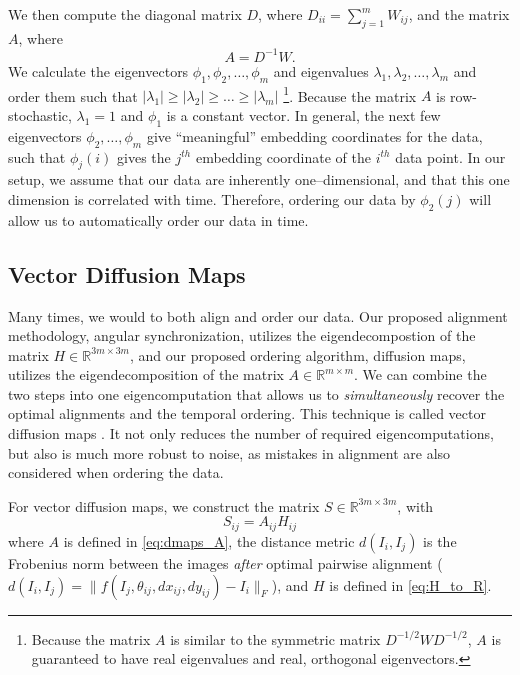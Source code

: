 \documentclass[11pt]{article}
\begin{document}
We then compute the diagonal matrix $D$, where $D_{ii} = \sum_{j=1}^{m} W_{ij}$, and the matrix $A$, where
\begin{equation} \label{eq:dmaps_A}
A = D^{-1} W.
\end{equation} 
%
We calculate the eigenvectors $\phi_1, \phi_2, \dots, \phi_m$ and eigenvalues $\lambda_1, \lambda_2, \dots, \lambda_m$ and order them such that $|\lambda_1| \ge |\lambda_2| \ge \dots \ge |\lambda_m|$ \footnote{Because the matrix $A$ is similar to the symmetric matrix $D^{-1/2} W D^{-1/2}$, $A$ is guaranteed to have real eigenvalues and real, orthogonal eigenvectors.}. 
%
Because the matrix $A$ is row-stochastic, $\lambda_1=1$ and $\phi_1$ is a constant vector.
%
In general, the next few eigenvectors $\phi_2, \dots, \phi_m$ give ``meaningful'' embedding coordinates for the data, such that $\phi_j(i)$ gives the $j^{th}$ embedding coordinate of the $i^{th}$ data point. 
%
In our setup, we assume that our data are inherently one--dimensional, and that this one dimension is correlated with time.
%
Therefore, ordering our data by $\phi_2(j)$ will allow us to automatically order our data in time. 

\subsection{Vector Diffusion Maps}

Many times, we would to both align and order our data.
%
Our proposed alignment methodology, angular synchronization, utilizes the eigendecompostion of the matrix $H \in \mathbb{R}^{3m \times 3m}$, and our proposed ordering algorithm, diffusion maps, utilizes the eigendecomposition of the matrix $A \in \mathbb{R}^{m \times m}$.
%
We can combine the two steps into one eigencomputation that allows us to {\em simultaneously} recover the optimal alignments and the temporal ordering.
%
This technique is called vector diffusion maps \cite{singer2012vector}.
%
It not only reduces the number of required eigencomputations, but also is much more robust to noise, as mistakes in alignment are also considered when ordering the data.

For vector diffusion maps, we construct the matrix $S \in \mathbb{R}^{3m \times 3m}$, with
\begin{equation}
	S_{ij} = A_{ij} H_{ij}
\end{equation}
%
where $A$ is defined in \eqref{eq:dmaps_A}, the distance metric $d(I_i, I_j)$ is the Frobenius norm between the images {\em after} optimal pairwise alignment ($d(I_i, I_j) = \| f(I_j, \theta_{ij}, dx_{ij}, dy_{ij}) - I_i \|_F$), and $H$ is defined in \eqref{eq:H_to_R}.
\end{document}
